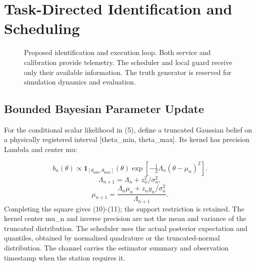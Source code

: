 \documentclass[10pt,twocolumn,letterpaper]{article}
\begin{document}
\section{Task-Directed Identification and Scheduling}
\begin{figure}[t]
\centering
{}
\caption{Proposed identification and execution loop. Both service and calibration provide telemetry. The scheduler and local guard receive only their available information. The truth generator is reserved for simulation dynamics and evaluation.}
\end{figure}
\subsection{Bounded Bayesian Parameter Update}
For the conditional scalar likelihood in (5), define a truncated Gaussian belief on a physically registered interval [theta\_min, theta\_max]. Its kernel has precision Lambda and center mu:

\begin{equation}
b_n(\theta)\propto \mathbf1_{[\theta_{\min},\theta_{\max}]}(\theta)\exp[-\tfrac12\Lambda_n(\theta-\mu_n)^2].
\end{equation}
\begin{equation}
\Lambda_{n+1}=\Lambda_n+z_n^2/\sigma_n^2,
\end{equation}
\begin{equation}
\mu_{n+1}=\frac{\Lambda_n\mu_n+z_n y_n/\sigma_n^2}{\Lambda_{n+1}}.
\end{equation}
Completing the square gives (10)-(11); the support restriction is retained. The kernel center mu\_n and inverse precision are not the mean and variance of the truncated distribution. The scheduler uses the actual posterior expectation and quantiles, obtained by normalized quadrature or the truncated-normal distribution. The channel carries the estimator summary and observation timestamp when the station requires it.
\end{document}
